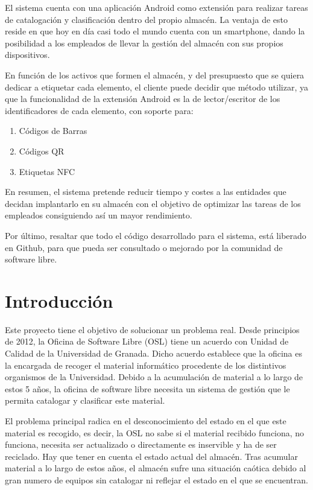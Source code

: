 \documentclass[a4paper,11pt]{book}
\begin{document}
El sistema cuenta con una aplicación Android como extensión para realizar tareas de catalogación y clasificación dentro del propio almacén. La ventaja de esto reside en que hoy en día casi todo el mundo cuenta con un smartphone, dando la posibilidad a los empleados de llevar la gestión del almacén con sus propios dispositivos.

En función de los activos que formen el almacén, y del presupuesto que se quiera dedicar a etiquetar cada elemento, el cliente puede decidir que método utilizar, ya que la funcionalidad de la extensión  Android es la de lector/escritor de los identificadores de cada elemento, con soporte para:

\begin{enumerate}
\item Códigos de Barras
\item Códigos QR
\item Etiquetas NFC 
\end{enumerate}


En resumen, el sistema pretende reducir tiempo y costes a las entidades que decidan implantarlo en su almacén con el objetivo  de optimizar las tareas de los empleados consiguiendo así un mayor rendimiento. 

Por último, resaltar que todo el código desarrollado para el sistema, está liberado en Github, para que pueda ser consultado o mejorado por la comunidad de software libre.


\section{Introducción}

Este proyecto tiene el objetivo de solucionar un problema real. Desde principios de 2012, la Oficina de Software Libre (OSL) tiene un acuerdo con Unidad de Calidad de la Universidad de Granada. Dicho acuerdo establece que la oficina es la encargada de recoger el material  informático procedente de los distintivos organismos de la Universidad. Debido a la acumulación de material a lo largo de estos 5 años, la oficina de software libre necesita un sistema de gestión que le permita catalogar y clasificar este material.

El problema principal radica en el desconocimiento del estado en el que este material es recogido, es decir, la OSL no sabe si el material recibido funciona, no funciona, necesita ser actualizado o directamente es inservible y ha de ser reciclado. Hay que tener en cuenta el estado actual del almacén. Tras acumular material a lo largo de estos años, el almacén sufre una situación caótica debido al gran numero de equipos sin catalogar ni reflejar el estado en el que se encuentran. 
\end{document}
